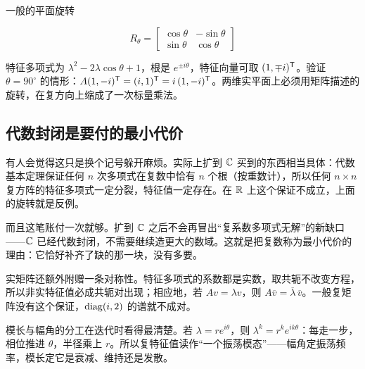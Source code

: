 一般的平面旋转

\[
R_\theta=\begin{bmatrix}\cos\theta&-\sin\theta\\\sin\theta&\cos\theta\end{bmatrix}
\]

特征多项式为 \(\lambda^2-2\lambda\cos\theta+1\)，根是 \(e^{\pm i\theta}\)，特征向量可取 \((1,\mp i)^{\mathsf{T}}\)。验证 \(\theta=90^\circ\) 的情形：\(A(1,-i)^{\mathsf{T}}=(i,1)^{\mathsf{T}}=i\,(1,-i)^{\mathsf{T}}\)。两维实平面上必须用矩阵描述的旋转，在复方向上缩成了一次标量乘法。

\subsection{代数封闭是要付的最小代价}

有人会觉得这只是换个记号躲开麻烦。实际上扩到 \(\mathbb{C}\) 买到的东西相当具体：代数基本定理保证任何 \(n\) 次多项式在复数中恰有 \(n\) 个根（按重数计），所以任何 \(n\times n\) 复方阵的特征多项式一定分裂，特征值一定存在。在 \(\mathbb{R}\) 上这个保证不成立，上面的旋转就是反例。

而且这笔账付一次就够。扩到 \(\mathbb{C}\) 之后不会再冒出``复系数多项式无解''的新缺口——\(\mathbb{C}\) 已经代数封闭，不需要继续造更大的数域。这就是把复数称为最小代价的理由：它恰好补齐了缺的那一块，没有多要。

实矩阵还额外附赠一条对称性。特征多项式的系数都是实数，取共轭不改变方程，所以非实特征值必成共轭对出现；相应地，若 \(Av=\lambda v\)，则 \(A\overline v=\overline\lambda\,\overline v\)。一般复矩阵没有这个保证，\(\operatorname{diag}(i,2)\) 的谱就不成对。

模长与幅角的分工在迭代时看得最清楚。若 \(\lambda=re^{i\theta}\)，则 \(\lambda^k=r^ke^{ik\theta}\)：每走一步，相位推进 \(\theta\)，半径乘上 \(r\)。所以复特征值读作``一个振荡模态''——幅角定振荡频率，模长定它是衰减、维持还是发散。

